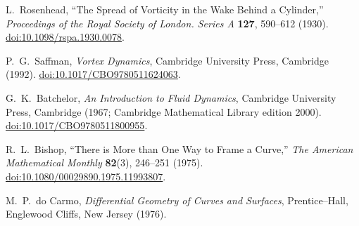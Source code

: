 
L.~Rosenhead,
``The Spread of Vorticity in the Wake Behind a Cylinder,''
\emph{Proceedings of the Royal Society of London. Series A} \textbf{127}, 590--612 (1930).
\href{https://doi.org/10.1098/rspa.1930.0078}{doi:10.1098/rspa.1930.0078}.

P.~G.~Saffman,
\emph{Vortex Dynamics},
Cambridge University Press, Cambridge (1992).
\href{https://doi.org/10.1017/CBO9780511624063}{doi:10.1017/CBO9780511624063}.

G.~K.~Batchelor,
\emph{An Introduction to Fluid Dynamics},
Cambridge University Press, Cambridge (1967; Cambridge Mathematical Library edition 2000).
\href{https://doi.org/10.1017/CBO9780511800955}{doi:10.1017/CBO9780511800955}.

R.~L.~Bishop,
``There is More than One Way to Frame a Curve,''
\emph{The American Mathematical Monthly} \textbf{82}(3), 246--251 (1975).
\href{https://doi.org/10.1080/00029890.1975.11993807}{doi:10.1080/00029890.1975.11993807}.

M.~P.~do Carmo,
\emph{Differential Geometry of Curves and Surfaces},
Prentice--Hall, Englewood Cliffs, New Jersey (1976).

